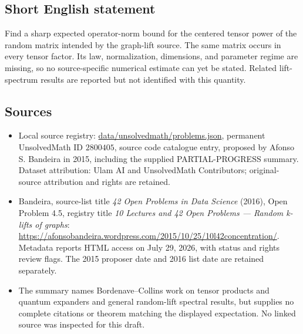 \documentclass[11pt]{article}
\begin{document}
\subsection{Short English statement}
Find a sharp expected operator-norm bound for the centered tensor power of the random matrix intended by the graph-lift source. The same matrix occurs in every tensor factor. Its law, normalization, dimensions, and parameter regime are missing, so no source-specific numerical estimate can yet be stated. Related lift-spectrum results are reported but not identified with this quantity.
\subsection{Sources}
\begin{itemize}
\item Local source registry: \url{data/unsolvedmath/problems.json}, permanent UnsolvedMath ID $2800405$, source code catalogue entry, proposed by Afonso S. Bandeira in 2015, including the supplied PARTIAL-PROGRESS summary. Dataset attribution: Ulam AI and UnsolvedMath Contributors; original-source attribution and rights are retained.
\item Bandeira, source-list title \emph{42 Open Problems in Data Science} (2016), Open Problem 4.5, registry title \emph{10 Lectures and 42 Open Problems --- Random k-lifts of graphs}: \url{https://afonsobandeira.wordpress.com/2015/10/25/10l42concentration/}. Metadata reports HTML access on July 29, 2026, with status and rights review flags. The 2015 proposer date and 2016 list date are retained separately.
\item The summary names Bordenave--Collins work on tensor products and quantum expanders and general random-lift spectral results, but supplies no complete citations or theorem matching the displayed expectation. No linked source was inspected for this draft.
\end{itemize}
\end{document}
